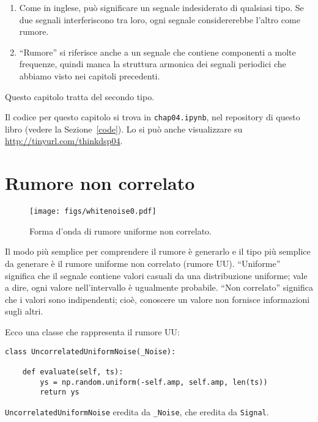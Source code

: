 \documentclass[12pt,a4paper]{book}
\begin{document}
\begin{enumerate} 

\item Come in inglese, può significare un segnale indesiderato di qualsiasi tipo. Se due segnali interferiscono tra loro, ogni segnale considererebbe l'altro come rumore.

\item ``Rumore'' si riferisce anche a un segnale che contiene componenti a molte frequenze, quindi manca la struttura armonica dei segnali periodici che abbiamo visto nei capitoli precedenti.

\end{enumerate} 

Questo capitolo tratta del secondo tipo.

Il codice per questo capitolo si trova in {\tt chap04.ipynb}, nel repository di questo libro (vedere la Sezione~\ref{code}). Lo si può anche visualizzare su \url{http://tinyurl.com/thinkdsp04}.

\section{Rumore non correlato} 

\begin{figure} 

\centerline{\texttt{[image: figs/whitenoise0.pdf]}} \caption{Forma d'onda di rumore uniforme non correlato.} \label{fig.whitenoise0} \end{figure} 

Il modo più semplice per comprendere il rumore è generarlo e il tipo più semplice da generare è il rumore uniforme non correlato (rumore UU). ``Uniforme'' significa che il segnale contiene valori casuali da una distribuzione uniforme; vale a dire, ogni valore nell'intervallo è ugualmente probabile. ``Non correlato'' significa che i valori sono indipendenti; cioè, conoscere un valore non fornisce informazioni sugli altri.

Ecco una classe che rappresenta il rumore UU:

\begin{verbatim} 
class UncorrelatedUniformNoise(_Noise):

    def evaluate(self, ts):
        ys = np.random.uniform(-self.amp, self.amp, len(ts))
        return ys
 \end{verbatim} 

{\tt UncorrelatedUniformNoise} eredita da \verb"_Noise", che eredita da {\tt Signal}.
\end{document}

